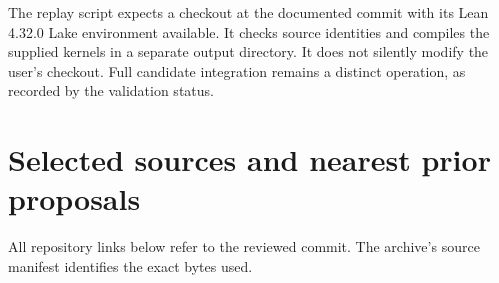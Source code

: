 \documentclass[11pt,letterpaper]{article}
\begin{document}
The replay script expects a checkout at the documented commit with its Lean 4.32.0 Lake environment available. It checks source identities and compiles the supplied kernels in a separate output directory. It does not silently modify the user's checkout. Full candidate integration remains a distinct operation, as recorded by the validation status.

\section*{Selected sources and nearest prior proposals}

All repository links below refer to the reviewed commit. The archive's source manifest identifies the exact bytes used.
\end{document}
